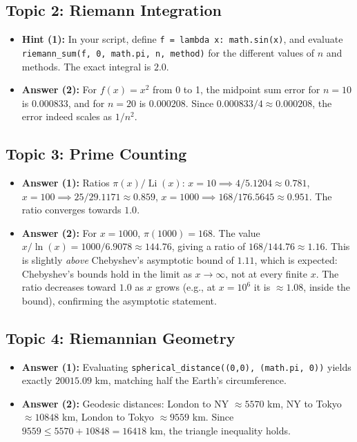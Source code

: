 \documentclass[11pt]{article}
\begin{document}
\subsection{Topic 2: Riemann Integration}
\begin{itemize}
    \item \textbf{Hint (1):} In your script, define \texttt{f = lambda x: math.sin(x)}, and evaluate \texttt{riemann\_sum(f, 0, math.pi, n, method)} for the different values of $n$ and methods. The exact integral is $2.0$.
    \item \textbf{Answer (2):} For $f(x)=x^2$ from 0 to 1, the midpoint sum error for $n=10$ is $0.000833$, and for $n=20$ is $0.000208$. Since $0.000833 / 4 \approx 0.000208$, the error indeed scales as $1/n^2$.
\end{itemize}

\subsection{Topic 3: Prime Counting}
\begin{itemize}
    \item \textbf{Answer (1):} Ratios $\pi(x) / \operatorname{Li}(x)$:
    $x = 10 \implies 4 / 5.1204 \approx 0.781$,
    $x = 100 \implies 25 / 29.1171 \approx 0.859$,
    $x = 1000 \implies 168 / 176.5645 \approx 0.951$.
    The ratio converges towards $1.0$.
    \item \textbf{Answer (2):} For $x=1000$, $\pi(1000) = 168$. The value $x / \ln(x) = 1000 / 6.9078 \approx 144.76$, giving a ratio of $168 / 144.76 \approx 1.16$. This is slightly \emph{above} Chebyshev's asymptotic bound of $1.11$, which is expected: Chebyshev's bounds hold in the limit as $x \to \infty$, not at every finite $x$. The ratio decreases toward $1.0$ as $x$ grows (e.g., at $x = 10^6$ it is $\approx 1.08$, inside the bound), confirming the asymptotic statement.
\end{itemize}

\subsection{Topic 4: Riemannian Geometry}
\begin{itemize}
    \item \textbf{Answer (1):} Evaluating \texttt{spherical\_distance((0,0), (math.pi, 0))} yields exactly $20015.09$ km, matching half the Earth's circumference.
    \item \textbf{Answer (2):} Geodesic distances: London to NY $\approx 5570$ km, NY to Tokyo $\approx 10848$ km, London to Tokyo $\approx 9559$ km. Since $9559 \le 5570 + 10848 = 16418$ km, the triangle inequality holds.
\end{itemize}
\end{document}
